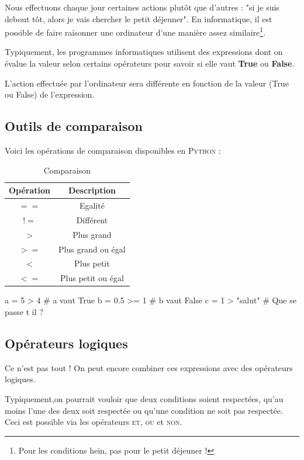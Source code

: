 Nous effectuons chaque jour certaines actions plutôt que d'autres : "si je suis debout tôt, alors je vais chercher le petit déjeuner". En informatique, il est possible de faire raisonner une ordinateur d'une manière assez similaire\footnote{Pour les conditions hein, pas pour le petit déjeuner !}. %

Typiquement, les programmes informatiques utilisent des expressions dont on évalue la valeur selon certains opérateurs pour savoir si elle vaut \textbf{True} ou \textbf{False}.

L'action effectuée par l'ordinateur sera différente en fonction de la valeur (True ou False) de l'expression.

\subsection{Outils de comparaison}
Voici les opérations de comparaison disponibles en \textsc{Python} :

\begin{table}[!h]
    \centering
    \begin{tabular}{|c|c|}
        \hline
         Opération & Description\\
        \hline
        $==$ & Egalité \\
        \hline
        $!=$ & Différent \\
        \hline
        $>$ & Plus grand \\
        \hline
        $>=$ & Plus grand ou égal \\
        \hline
        $<$ & Plus petit  \\
        \hline
        $<=$  & Plus petit ou égal \\
        \hline
    \end{tabular}
    \caption{Comparaison}
    \label{operStr}
\end{table}

\begin{python}[caption = Quelques comparaisons en python]
a = 5 > 4 # a vaut True
b = 0.5 >= 1 # b vaut False
c = 1 > "salut" # Que se passe t il ?
\end{python}

\subsection{Opérateurs logiques}
Ce n'est pas tout ! On peut encore combiner ces expressions avec des opérateurs logiques.

Typiquement,on pourrait vouloir que deux conditions soient respectées, qu'au moins l’une des deux soit respectée ou qu'une condition ne soit pas respectée. Ceci est possible via les opérateurs \textsc{et}, \textsc{ou} et \textsc{non}. 
